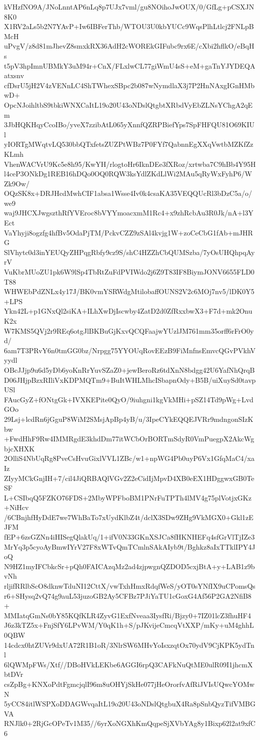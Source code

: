 kVHzfNO9A/JNoLnntAP6nLq8p7UJx7vml/gu8NOihoJwOUX/0/GfLg+pCSXJN8K0
X1RV2aLs5b2N7YAvP+Iw6IBFerThb/WTOU3U0kbYUCc9WqsPlhLtlcj2FNLpBMcH
uPvgV/z8d81mJhevZ8smxkRX36AdH2cWOREkGIFubc9rx6E/cXbi2hflkO/eBqHs
t5pV3hpImnUBMkY3uM94r+CnX/FLxlwCL77giWmU4sS+eM+gaTnYJYDEQAatxsnv
cfDsrU5jH2V4zVENnLC4ShTWhexSBpc2b087wNymdlaX3j7P2HnNAxgIGnHMbwD+
OpcNJoihltbS9tbkiWNXCaItL19o20U43oNDslQtgbtXRbdVyEbZLNsYChgA2qEm
3JbHQKHqyCcoIBo/yveX7zzibAtL065yXnnfQZRPBiefYps7SpFHFQU81O69KIUl
yIORTgMWqtvLQ530bbQTxfetsZUZPtWBz7P0FYf7QabnnEgXXqVwtbMZKfZzKLmh
VhenWACVrU9Kc5e8h95/KwYH/rlogtoHr6IknDEe3fXRoz/xrtwba7C9hBb4Y95H
l4ceP3ONkDg1REB16hDQo0OQ0RQW3ksYdlZKdLlWi2MAu5qRyWxFyhP6/WZk9Ow/
OQzSK8x+DRJHcdMwhCIF1absa1Wsse4Iv0k4csaKA35VEQQUcRl3bDzC5a/o/we9
waj9JHCXJwgszthRfYVEroc8bVYYmoacxmM1Rc4+x9zhRcbAu3R0Jk/nA+l3YEct
VaYhyji8ogzfg4hfBv5OdaPjTM/PckvCZZ9zSAl4kvjg1W+zoCeCbG1fAb+mJHRG
SlVhytc0d3inYEUQyZHPqgRbfy9cz9S/shC4HZZhCbQUMSzba/7yOsUHQhpqAyrV
VuKbrMUoZU1pk6W9lSp4TbRtZuFdPVIWdo2j6Z9T83IF8BiymJONV6655FLD0T88
WHWEbPdZNLx4y17J/BK0vmYSRWdgMtilobaffOUNS2V2c6MOj7nv5/lDK0Y5+LPS
Ykn42L+p1GNxQl2siKA+ILhXwDjIscwby4ZatD2d0ZfRxxbwX3+F7d+mk2OnuK2x
W7KMS5QVj2r9REq6otgJlBKBuGjKxvQCQFaajwYUzlJM761mm35orff6rFrO0yd/
6am7T3PRvY6n0tmGG0bz/Nrpgg75YYOUqRovEEzB9FiMnfnsEmvcQGvPVkhVyydl
OBcJJjp9u6d5yDb6yoKnRrYuvSZaZ0+jewBeroRz6tdXnN8bdgg42U6YafNhQrqB
D06JHjpBzxRIliVxKDPMQTm9+BuItWHLMhcISbapnOdy+B5B/uiXuySd0tavpUSl
FAucGyZ+fONtgGk+IVXKEPite0QyO/9iuhgni1kgVkMHi+pSZ14Td9pWg+LvdGOo
29Lsj+lcdRn6jGguP8WiM2SMsjApBp4yB/u/3IpeCYkEQQEJVRr9mdngonSIzKbw
+FwdHhF9Rw4IMMRgdE3khdDm77itWCbOrBORTmSdyR0VmPuegpX2AkcWgbjcXHXK
2OlliS4NbUqRg8PveCsHvuGixlVVL1ZBc/w1+npWG4Pb0uyP6Vx1GfqMaC4/xaIz
ZIyyMCkGnjIH+7/cil4JiQRBAQlVGv2Z2eCidIjMpvD4XB0eEX1HDggwxGB0TeSF
L+CSIbqQ5FZKO76FDS+2MbyWPFboBM1PNrFuTPTh4lMV4g75plVotjxGKz+NiHcv
/6CBnjhfHyDdE7we7WhBaTo7xUydKlbZ4t/dclX3SDw9ZHg9VkMGX0+Gkl1zEJFM
fEP+6zsGZNn4iHISegQlakUq/1+ifV0N33GKnXSJCa8fHKNHEFq4sfGrVlTjIZe3
MrYq3p5cyoAyBmwIYrV27F8xWTvQmTCmlnSAkAIyb9t/Bghkz8aIxTTklIPY4JoQ
N9HZ1myIFCbkcSr+pQh0FAICAzqMz2ad4zjpwgnQZDOD5cxjBtA+y+LAB1z9bvNh
rljifRRlbScO8dknwTduNI12CttX/vwTxhHmxRdqfWeS/yOT0sYNfIX9uCPomsQs
r6+SHysq2vQ74g9auL53juzoGB2Ay5CFBz7PJiYaTU1cGoxG4Af56P2GA2NfiB8+
MMIatqGmNs0bY85KQfKLR4ZyvG1ExfNveaa3IysfRi/Bjzy0+7IZ01lcZ3fhuHF4
J6z3kTZ5x+FnjSfY6LPvWM/Y0qK1h+S/pJKvijeCmcqVtXXP/mKy+uM4ghhL0QBW
14cdcx0htZUVr9dxUA72R1B1oR/3NlrSW6MHvYoIsxzqtOx70ydV9CjKPK5ydTnl
6lQWMpFWs/Xtf//DBoHVkLEKbe6AGGI6rpQ3CAFkNuQtME0ulR09I1jhcmXbtDVr
csZpBg+KNXoPdtFgmcjqlI96m8uOHYjSkHe077jHeOrorfvAfRiJVIsUQwcYOMwN
5yCC84itlWSPXoDDAGWvqaItL19o20U43oNDslQtgbuX4Ra8pSnbQyzTifVMBGVA
RNJlk0+2RjGcOPeTv1M35//6yrXoNGXhKmQqpeSjXVbYAg8y1Bixp62l2at9xfC6
